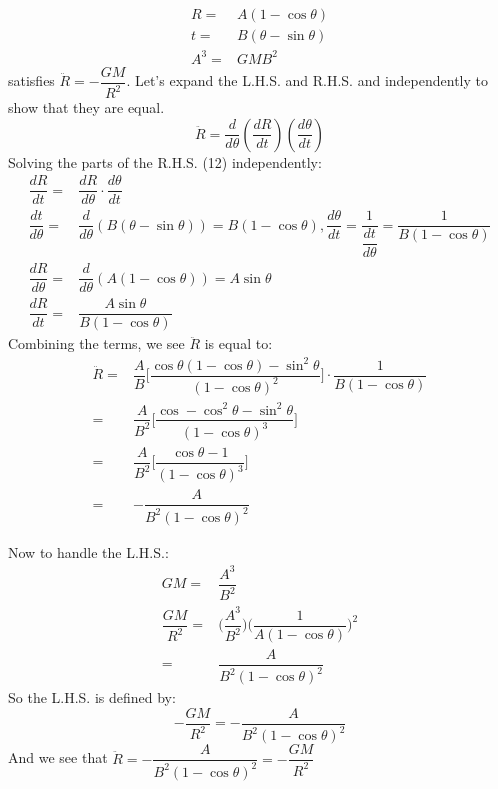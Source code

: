 \documentclass[a4paper]{article}
\begin{document}
\begin{align*}
R =& A(1-\cos \theta)\\
t =& B(\theta - \sin \theta)\\
A^3 =& GMB^2
\end{align*}
\noindent satisfies $\ddot{R} = - \dfrac{GM}{R^2}$. Let's expand the L.H.S. and R.H.S. and independently to show that they are equal.\\
\begin{equation} \label{eq:12}
\ddot{R} = \dfrac{d}{d \theta} (\dfrac{dR}{dt})(\dfrac{d \theta}{dt})
\end{equation}
\noindent Solving the parts of the R.H.S. (12) independently:
\begin{align*}
\dfrac{dR}{dt} =& \dfrac{dR}{d \theta} \cdot \dfrac{d \theta}{dt} \\
\dfrac{dt}{d \theta} =& \dfrac{d}{d \theta}(B(\theta - \sin \theta)) = B(1-\cos \theta),  \dfrac{d \theta}{dt} = \dfrac{1}{\dfrac{dt}{d \theta}} = \dfrac{1}{B(1-\cos \theta)}\\ 
\dfrac{dR}{d \theta} =& \dfrac{d}{d \theta}(A(1-\cos \theta)) = A \sin \theta\\
\dfrac{dR}{dt} =& \dfrac{A \sin \theta}{B(1-\cos \theta)}
\end{align*}
Combining the terms, we see $\ddot{R}$ is equal to:\\
\begin{align}
\ddot{R} =& \dfrac{A}{B} \Big[ \dfrac{\cos \theta(1-\cos \theta) - \sin^2 \theta}{(1 - \cos \theta)^2} \Big] \cdot \dfrac{1}{B(1-\cos \theta)}\\
=& \dfrac{A}{B^2} \Big[ \dfrac{\cos - \cos^2 \theta - \sin^2 \theta}{(1-\cos \theta)^3} \Big]\\
=& \dfrac{A}{B^2} \Big[ \dfrac{\cos \theta - 1}{(1 - \cos \theta)^3} \Big]\\
=& - \dfrac{A}{B^2(1-\cos \theta)^2}
\end{align}

Now to handle the L.H.S.:
\begin{align*}
GM =& \dfrac{A^3}{B^2}\\
\dfrac{GM}{R^2} =& \Big(\dfrac{A^3}{B^2}\Big)\Big(\dfrac{1}{A(1 - \cos \theta)}\Big)^2\\
=& \dfrac{A}{B^2(1-\cos \theta)^2}
\end{align*}
So the L.H.S. is defined by:
\begin{equation}
- \dfrac{GM}{R^2} = - \dfrac{A}{B^2(1-\cos \theta)^2}
\end{equation}
And we see that $\ddot{R} = - \dfrac{A}{B^2(1-\cos \theta)^2} = -\dfrac{GM}{R^2}$
\clearpage
\end{document}
